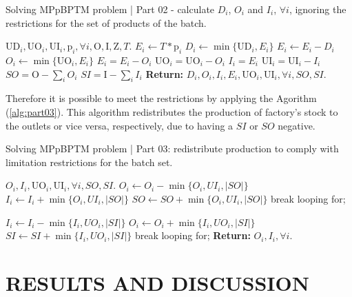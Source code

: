 \documentclass[10pt,fleqn,a4paper,twoside]{article}
\begin{document}
\begin{algorithm}
\caption{Solving MPpBPTM problem | Part 02 - calculate $D_i$, $O_i$ and $I_i$, $\forall i$, ignoring the restrictions for the set of products of the batch.}\label{alg:part02}
\begin{algorithmic}
	\Require $\textrm{UD}_i, \textrm{UO}_i, \textrm{UI}_i, \textrm{p}_i, \forall i, \textrm{O}, \textrm{I}, \textrm{Z}, T$.
		\State $E_i \gets T * \textrm{p}_i$
		\State $D_i \gets \min \{\textrm{UD}_i, E_i\}$
		\State $E_i \gets E_i - D_i$
		\State $O_i \gets \min \{\textrm{UO}_i, E_i\}$
		\State $E_i = E_i - O_i$
		\State $\textrm{UO}_i = \textrm{UO}_i - O_i$
		\State $I_i = E_i$
		\State $\textrm{UI}_i = \textrm{UI}_i - I_i$
	\EndFor
	\State $SO = \textrm{O} - \sum_i{O_i}$
	\State $SI = \textrm{I} - \sum_i{I_i}$
	\State \textbf{Return:} $D_i, O_i, I_i, E_i, \textrm{UO}_i, \textrm{UI}_i, \forall i, SO, SI$.
\end{algorithmic}
\end{algorithm}

Therefore it is possible to meet the restrictions by applying the Agorithm (\ref{alg:part03}). This algorithm redistributes the production of factory's stock to the outlets or vice versa, respectively, due to having a $SI$ or $SO$ negative.

\begin{algorithm}[h!]
\caption{Solving MPpBPTM problem | Part 03: redistribute production to comply with limitation restrictions for the batch set.}\label{alg:part03}
\begin{algorithmic}
\Require $O_i, I_i, \textrm{UO}_i, \textrm{UI}_i, \forall i, SO, SI$.
	\State $O_i \gets O_i - \min\{ O_i, UI_i, |SO|\}$
	\State $I_i \gets I_i + \min\{ O_i, UI_i, |SO|\}$
	\State $SO \gets SO + \min\{ O_i, UI_i, |SO|\}$
		break looping for;
	\EndIf
\EndFor
\EndIf

	\State $I_i \gets I_i - \min\{ I_i, UO_i, |SI|\}$
	\State $O_i \gets O_i + \min\{ I_i, UO_i, |SI|\}$
	\State $SI \gets SI + \min\{ I_i, UO_i, |SI|\}$
		break looping for;
	\EndIf
\EndFor
\EndIf
\State \textbf{Return:} $O_i, I_i, \forall i$.
\end{algorithmic}
\end{algorithm}

\section{RESULTS AND DISCUSSION}
\label{sec:results}
\end{document}
